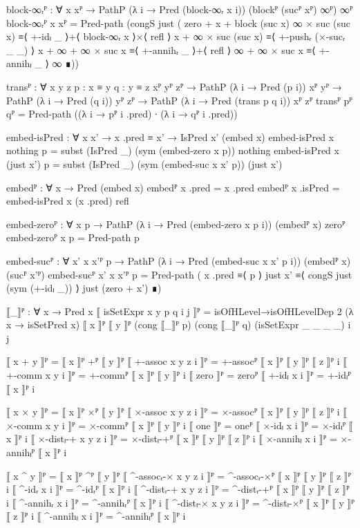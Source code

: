 \begin{code}[hide]
  block-∞ᵣᴾ :
    ∀ {x} xᴾ → PathP (λ i → Pred (block-∞ᵣ x i)) (blockᴾ (sucᴾ xᴾ) ∞ᴾ) ∞ᴾ
  block-∞ᵣᴾ {x} xᴾ =
    Pred-path
      (congS just
        ( zero + x + block (suc x) ∞ × suc (suc x) ≡⟨ +-idₗ _ ⟩+⟨ block-∞ᵣ x ⟩×⟨ refl ⟩
          x + ∞ × suc (suc x)                      ≡⟨ +-pushᵣ (×-sucᵣ _ _) ⟩
          x + ∞ + ∞ × suc x                      ≡⟨ +-annihᵣ _ ⟩+⟨ refl ⟩
          ∞ + ∞ × suc x                          ≡⟨ +-annihₗ _ ⟩
          ∞                                        ∎))

  transᴾ :
    ∀ {x y z} {p : x ≡ y} {q : y ≡ z} {xᴾ yᴾ zᴾ} →
    PathP (λ i → Pred (p i)) xᴾ yᴾ → PathP (λ i → Pred (q i)) yᴾ zᴾ →
    PathP (λ i → Pred (trans p q i)) xᴾ zᴾ
  transᴾ pᴾ qᴾ = Pred-path ((λ i → pᴾ i .pred) ∙ (λ i → qᴾ i .pred))

  embed-isPred : ∀ x x' → x .pred ≡ x' → IsPred x' (embed x)
  embed-isPred x nothing p = subst (IsPred _) (sym (embed-zero x p)) nothing
  embed-isPred x (just x') p =
    subst (IsPred _) (sym (embed-suc x x' p)) (just x')

  embedᴾ : ∀ x → Pred (embed x)
  embedᴾ x .pred = x .pred
  embedᴾ x .isPred = embed-isPred x (x .pred) refl

  embed-zeroᴾ : ∀ x p → PathP (λ i → Pred (embed-zero x p i)) (embedᴾ x) zeroᴾ
  embed-zeroᴾ x p = Pred-path p

  embed-sucᴾ :
    ∀ {x'} x x'ᴾ p →
    PathP (λ i → Pred (embed-suc x x' p i)) (embedᴾ x) (sucᴾ x'ᴾ)
  embed-sucᴾ {x'} x x'ᴾ p = Pred-path
    ( x .pred           ≡⟨ p ⟩
      just x'          ≡⟨ congS just (sym (+-idₗ _)) ⟩
      just (zero + x') ∎)

  ⟦_⟧ᴾ : ∀ x → Pred x
  ⟦ isSetExpr x y p q i j ⟧ᴾ =
    isOfHLevel→isOfHLevelDep 2 (λ x → isSetPred x)
      ⟦ x ⟧ᴾ ⟦ y ⟧ᴾ (cong ⟦_⟧ᴾ p) (cong ⟦_⟧ᴾ q) (isSetExpr _ _ _ _) i j

  ⟦ x + y ⟧ᴾ = ⟦ x ⟧ᴾ +ᴾ ⟦ y ⟧ᴾ
  ⟦ +-assoc x y z i ⟧ᴾ = +-assocᴾ ⟦ x ⟧ᴾ ⟦ y ⟧ᴾ ⟦ z ⟧ᴾ i
  ⟦ +-comm x y i ⟧ᴾ = +-commᴾ ⟦ x ⟧ᴾ ⟦ y ⟧ᴾ i
  ⟦ zero ⟧ᴾ = zeroᴾ
  ⟦ +-idₗ x i ⟧ᴾ = +-idₗᴾ ⟦ x ⟧ᴾ i

  ⟦ x × y ⟧ᴾ = ⟦ x ⟧ᴾ ×ᴾ ⟦ y ⟧ᴾ
  ⟦ ×-assoc x y z i ⟧ᴾ = ×-assocᴾ ⟦ x ⟧ᴾ ⟦ y ⟧ᴾ ⟦ z ⟧ᴾ i
  ⟦ ×-comm x y i ⟧ᴾ = ×-commᴾ ⟦ x ⟧ᴾ ⟦ y ⟧ᴾ i
  ⟦ one ⟧ᴾ = oneᴾ
  ⟦ ×-idₗ x i ⟧ᴾ = ×-idₗᴾ ⟦ x ⟧ᴾ i
  ⟦ ×-distₗ-+ x y z i ⟧ᴾ = ×-distₗ-+ᴾ ⟦ x ⟧ᴾ ⟦ y ⟧ᴾ ⟦ z ⟧ᴾ i
  ⟦ ×-annihₗ x i ⟧ᴾ = ×-annihₗᴾ ⟦ x ⟧ᴾ i

  ⟦ x ^ y ⟧ᴾ = ⟦ x ⟧ᴾ ^ᴾ ⟦ y ⟧ᴾ
  ⟦ ^-assocᵣ-× x y z i ⟧ᴾ = ^-assocᵣ-×ᴾ ⟦ x ⟧ᴾ ⟦ y ⟧ᴾ ⟦ z ⟧ᴾ i
  ⟦ ^-idᵣ x i ⟧ᴾ = ^-idᵣᴾ ⟦ x ⟧ᴾ i
  ⟦ ^-distᵣ-+ x y z i ⟧ᴾ = ^-distᵣ-+ᴾ ⟦ x ⟧ᴾ ⟦ y ⟧ᴾ ⟦ z ⟧ᴾ i
  ⟦ ^-annihᵣ x i ⟧ᴾ = ^-annihᵣᴾ ⟦ x ⟧ᴾ i
  ⟦ ^-distₗ-× x y z i ⟧ᴾ = ^-distₗ-×ᴾ ⟦ x ⟧ᴾ ⟦ y ⟧ᴾ ⟦ z ⟧ᴾ i
  ⟦ ^-annihₗ x i ⟧ᴾ = ^-annihₗᴾ ⟦ x ⟧ᴾ i


\end{code}
